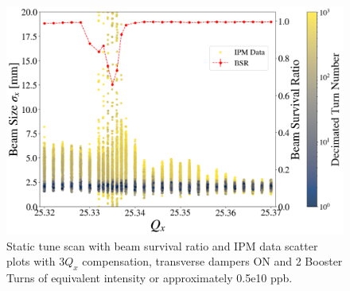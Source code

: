 \begin{figure}[H]
    \centering
    \includegraphics[width=\columnwidth]{chapter6/static2turns_dampersON.png}
    \caption{Static tune scan with beam survival ratio and IPM data scatter plots with $3Q_x$ compensation, transverse dampers ON and 2 Booster Turns of equivalent intensity or approximately 0.5e10 ppb.}
    \label{fig:static2_scatter_dampersON}
\end{figure}